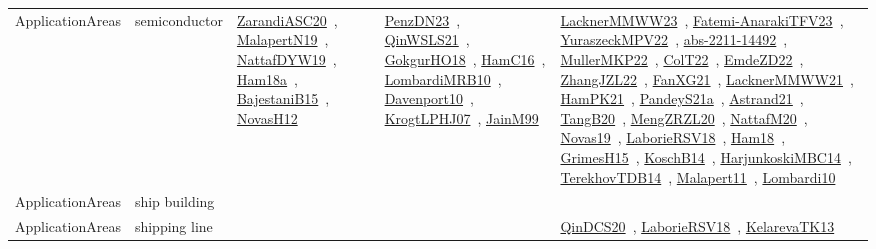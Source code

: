 {\begin{longtable}{lp{3cm}>{\raggedright\arraybackslash}p{6cm}>{\raggedright\arraybackslash}p{6cm}>{\raggedright\arraybackslash}p{8cm}}
ApplicationAreas & semiconductor & \href{../works/ZarandiASC20.pdf}{ZarandiASC20}~\cite{ZarandiASC20}, \href{../works/MalapertN19.pdf}{MalapertN19}~\cite{MalapertN19}, \href{../works/NattafDYW19.pdf}{NattafDYW19}~\cite{NattafDYW19}, \href{../works/Ham18a.pdf}{Ham18a}~\cite{Ham18a}, \href{../works/BajestaniB15.pdf}{BajestaniB15}~\cite{BajestaniB15}, \href{../works/NovasH12.pdf}{NovasH12}~\cite{NovasH12} & \href{../works/PenzDN23.pdf}{PenzDN23}~\cite{PenzDN23}, \href{../works/QinWSLS21.pdf}{QinWSLS21}~\cite{QinWSLS21}, \href{../works/GokgurHO18.pdf}{GokgurHO18}~\cite{GokgurHO18}, \href{../works/HamC16.pdf}{HamC16}~\cite{HamC16}, \href{../works/LombardiMRB10.pdf}{LombardiMRB10}~\cite{LombardiMRB10}, \href{../works/Davenport10.pdf}{Davenport10}~\cite{Davenport10}, \href{../works/KrogtLPHJ07.pdf}{KrogtLPHJ07}~\cite{KrogtLPHJ07}, \href{../works/JainM99.pdf}{JainM99}~\cite{JainM99} & \href{../works/LacknerMMWW23.pdf}{LacknerMMWW23}~\cite{LacknerMMWW23}, \href{../works/Fatemi-AnarakiTFV23.pdf}{Fatemi-AnarakiTFV23}~\cite{Fatemi-AnarakiTFV23}, \href{../works/YuraszeckMPV22.pdf}{YuraszeckMPV22}~\cite{YuraszeckMPV22}, \href{../works/abs-2211-14492.pdf}{abs-2211-14492}~\cite{abs-2211-14492}, \href{../works/MullerMKP22.pdf}{MullerMKP22}~\cite{MullerMKP22}, \href{../works/ColT22.pdf}{ColT22}~\cite{ColT22}, \href{../works/EmdeZD22.pdf}{EmdeZD22}~\cite{EmdeZD22}, \href{../works/ZhangJZL22.pdf}{ZhangJZL22}~\cite{ZhangJZL22}, \href{../works/FanXG21.pdf}{FanXG21}~\cite{FanXG21}, \href{../works/LacknerMMWW21.pdf}{LacknerMMWW21}~\cite{LacknerMMWW21}, \href{../works/HamPK21.pdf}{HamPK21}~\cite{HamPK21}, \href{../works/PandeyS21a.pdf}{PandeyS21a}~\cite{PandeyS21a}, \href{../works/Astrand21.pdf}{Astrand21}~\cite{Astrand21}, \href{../works/TangB20.pdf}{TangB20}~\cite{TangB20}, \href{../works/MengZRZL20.pdf}{MengZRZL20}~\cite{MengZRZL20}, \href{../works/NattafM20.pdf}{NattafM20}~\cite{NattafM20}, \href{../works/Novas19.pdf}{Novas19}~\cite{Novas19}, \href{../works/LaborieRSV18.pdf}{LaborieRSV18}~\cite{LaborieRSV18}, \href{../works/Ham18.pdf}{Ham18}~\cite{Ham18}, \href{../works/GrimesH15.pdf}{GrimesH15}~\cite{GrimesH15}, \href{../works/KoschB14.pdf}{KoschB14}~\cite{KoschB14}, \href{../works/HarjunkoskiMBC14.pdf}{HarjunkoskiMBC14}~\cite{HarjunkoskiMBC14}, \href{../works/TerekhovTDB14.pdf}{TerekhovTDB14}~\cite{TerekhovTDB14}, \href{../works/Malapert11.pdf}{Malapert11}~\cite{Malapert11}, \href{../works/Lombardi10.pdf}{Lombardi10}~\cite{Lombardi10}\\
ApplicationAreas & ship building &  &  & \\
ApplicationAreas & shipping line &  &  & \href{../works/QinDCS20.pdf}{QinDCS20}~\cite{QinDCS20}, \href{../works/LaborieRSV18.pdf}{LaborieRSV18}~\cite{LaborieRSV18}, \href{../works/KelarevaTK13.pdf}{KelarevaTK13}~\cite{KelarevaTK13}\\

\end{longtable}}
